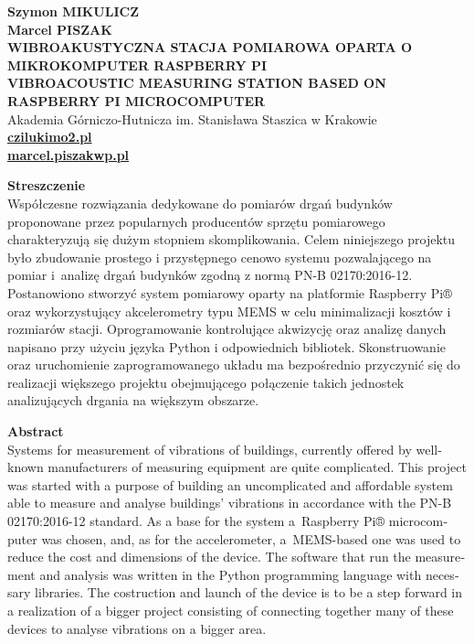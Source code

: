 \documentclass[a4paper,12pt]{mwart}
\title{}
\begin{document}
\onehalfspacing
{\raggedright%
  \textbf{Szymon \MakeUppercase{Mikulicz}} \\
  \textbf{Marcel \MakeUppercase{Piszak}} \\
  \vspace*{5pt}%
  \MakeUppercase{\textbf{Wibroakustyczna stacja pomiarowa oparta o mikrokomputer Raspberry Pi}} \\
  \vspace*{5pt}%
  \MakeUppercase{\textbf{Vibroacoustic measuring station based on Raspberry Pi microcomputer}} \\
  \vspace*{5pt}%
  Akademia Górniczo-Hutnicza im. Stanisława Staszica w Krakowie\\
  \vspace*{5pt}%
  \href{mailto:czilukim@o2.pl}{\textsf{\textbf{czilukim\MVAt o2.pl}}}\\
  \href{mailto:marcel.piszak@wp.pl}{\textsf{\textbf{marcel.piszak\MVAt wp.pl}}}

  \vspace*{5pt}%
}%

\noindent\textbf{Streszczenie}\\
Współczesne rozwiązania dedykowane do pomiarów drgań budynków proponowane przez
popularnych producentów sprzętu pomiarowego charakteryzują się dużym stopniem
skomplikowania. Celem niniejszego projektu było zbudowanie prostego i
przystępnego cenowo systemu pozwalającego na pomiar i~analizę drgań budynków
zgodną z normą PN-B 02170:2016-12. Postanowiono stworzyć system pomiarowy
oparty na platformie Raspberry Pi® oraz wykorzystujący akcelerometry typu MEMS
w celu minimalizacji kosztów i rozmiarów stacji. Oprogramowanie kontrolujące
akwizycję oraz analizę danych napisano przy użyciu języka Python i odpowiednich
bibliotek. Skonstruowanie oraz uruchomienie zaprogramowanego układu ma
bezpośrednio przyczynić się do realizacji większego projektu obejmującego
połączenie takich jednostek analizujących drgania na większym obszarze.
\vspace*{5pt}

\noindent
\begin{otherlanguage}{english}
\textbf{Abstract} \\
Systems for measurement of vibrations of buildings, currently offered by
well-known manufacturers of measuring equipment are quite complicated. This
project was started with a purpose of building an uncomplicated and affordable
system able to measure and analyse buildings' vibrations in accordance with the
PN-B 02170:2016-12 standard. As a base for the system a~Raspberry Pi®
microcomputer was chosen, and, as for the accelerometer, a~MEMS-based one was
used to reduce the cost and dimensions of the device. The software that run the
measurement and analysis was written in the Python programming language with
necessary libraries. The costruction and launch of the device is to be a step
forward in a realization of a bigger project consisting of connecting together
many of these devices to analyse vibrations on a bigger area.
\end{otherlanguage}
\vspace*{24pt}
\end{document}
